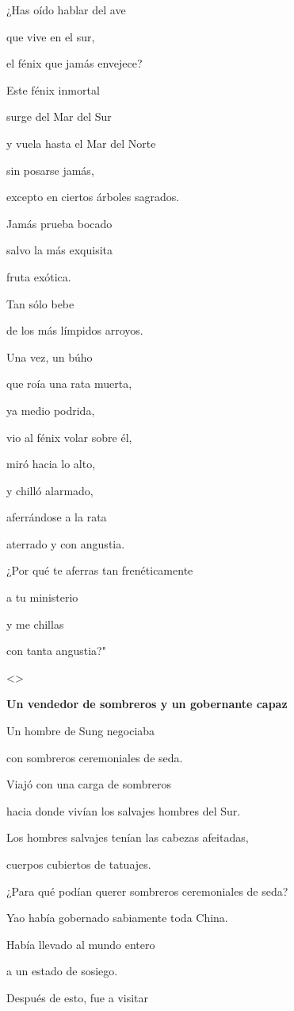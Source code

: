 ¿Has oído hablar del ave

que vive en el sur,

el fénix que jamás envejece?

Este fénix inmortal

surge del Mar del Sur

y vuela hasta el Mar del Norte

sin posarse jamás,

excepto en ciertos árboles sagrados.

Jamás prueba bocado

salvo la más exquisita

fruta exótica.

Tan sólo bebe

de los más límpidos arroyos.

Una vez, un búho

que roía una rata muerta,

ya medio podrida,

vio al fénix volar sobre él,

miró hacia lo alto,

y chilló alarmado,

aferrándose a la rata

aterrado y con angustia.

¿Por qué te aferras tan frenéticamente

a tu ministerio

y me chillas

con tanta angustia?"

\textless\textgreater{}

\textbf{{Un vendedor de sombreros y un gobernante capaz}}

Un hombre de Sung negociaba

con sombreros ceremoniales de seda.

Viajó con una carga de sombreros

hacia donde vivían los salvajes hombres del Sur.

Los hombres salvajes tenían las cabezas afeitadas,

cuerpos cubiertos de tatuajes.

¿Para qué podían querer sombreros ceremoniales de seda?

Yao había gobernado sabiamente toda China.

Había llevado al mundo entero

a un estado de sosiego.

Después de esto, fue a visitar

